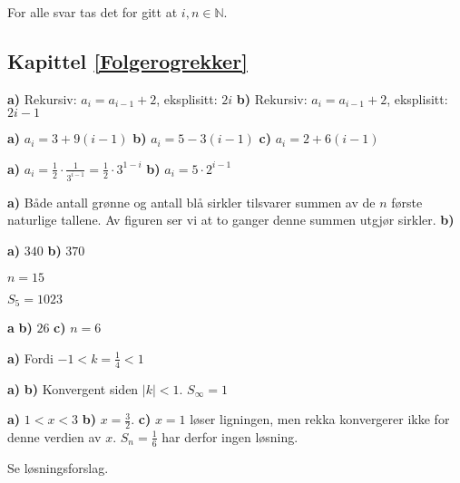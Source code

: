 




\footnotesize

For alle svar tas det for gitt at $ i,n\in\mathbb{N} $.

\subsection*{Kapittel \ref{Folgerogrekker}}
\textbf{a)} Rekursiv: $ {a_i=a_{i-1}+2 }$, eksplisitt: $ 2i $
\textbf{b)} Rekursiv: $ {a_i=a_{i-1}+2 }$, eksplisitt: $ {2i-1} $

\textbf{a)} $ a_i = 3+9(i-1) $
\textbf{b)} $ a_i = 5-3(i-1) $
\textbf{c)} $ a_i = 2+6(i-1) $

\textbf{a)} $ a_i = \frac{1}{2}\cdot\frac{1}{3^{i-1}}=\frac{1}{2}\cdot3^{1-i} $
\textbf{b)} $ a_i = 5\cdot2^{i-1}  $

 \textbf{a)} Både antall grønne og antall blå sirkler tilsvarer summen av de $ n $ første naturlige tallene. Av figuren ser vi at to ganger denne summen utgjør  sirkler. \textbf{b)} \selos

\textbf{a)} $ 340 $
\textbf{b)} $ 370 $

$ n=15 $

 \selos

$ S_5=1023 $


\textbf{a} \selos
\textbf{b)} $ 26 $
\textbf{c)} $ n=6 $



\textbf{a)} Fordi $ -1<k=\frac{1}{4}<1 $

\begin{comment}
	\opr{stav}
Lengden blir $ \frac{10}{9} $ m.
\end{comment}
 \textbf{a)}  \textbf{b)} Konvergent siden $ |k|<1 $. $ S_\infty=1 $

\textbf{a)} $ 1<x<3 $
\textbf{b)} $ x=\frac{3}{2} $.
\textbf{c)} $ x=1 $ løser ligningen, men rekka konvergerer ikke for denne verdien av $ x $. $ S_n=\frac{1}{6} $ har derfor ingen løsning.

 Se løsningsforslag.

 \selos

 \selos
